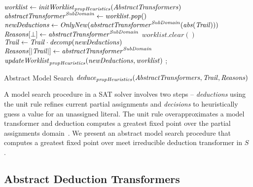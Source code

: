 \begin{algorithm2e}[t]
\DontPrintSemicolon
{}
\begin{small}
$\mathit{worklist} \leftarrow \mathit{initWorklist}_{\mathit{propHeuristics}}(\mathit{AbstractTransformers})$ \;
{
  $\mathit{abstractTransformer}^{\mathit{SubDomain}} \leftarrow \mathit{worklist.pop}()$ \; 
  $\mathit{newDeductions} \leftarrow \mathit{OnlyNew}(\mathit{abstractTransformer}^{\mathit{SubDomain}}(\mathit{abs}(\mathit{Trail})))$\;
  \uIf{$\newdeductions = \bot$} {
    $\mathit{Reasons}[\bot] \leftarrow \mathit{abstractTransformer}^{\mathit{SubDomain}}$  \;
    $\mathit{worklist.clear}()$ \;
    \return \conflict \;
  }
  \uElse
  {
    $\mathit{Trail} \leftarrow \mathit{Trail} \cdot {\mathit{decomp}}(\mathit{newDeductions})$ \; 
    $\mathit{Reasons}[|\mathit{Trail}|] \leftarrow \mathit{abstractTransformer}^{\mathit{SubDomain}}$ \;
    $\mathit{updateWorklist}_{\mathit{propHeuristics}}(\mathit{newDeductions}, \mathit{worklist})$ \; 
  }
}
 {
  \return \sat;
}
 \return \unknown \;

\end{small}
\caption{Abstract Model Search $\mathit{deduce}_{\mathit{propHeuristics}}(\mathit{AbstractTransformers},\mathit{Trail},\mathit{Reasons})$ \label{Alg:ms}}
\end{algorithm2e}
%  
A model search procedure in a SAT solver involves two steps -- {\em deductions} 
using the unit rule refines current partial assignments and 
{\em decisions} to heuristically guess a value for an unassigned 
literal.  The unit rule overapproximates a model transformer and deduction 
computes a greatest fixed point over the partial assignments
domain~\cite{dhk2013-popl}.  We present an abstract model search procedure 
that computes a greatest fixed point over meet irreducible deduction 
transformer in $S$ .  
%

\subsection{Abstract Deduction Transformers} \label{sec:abst}

